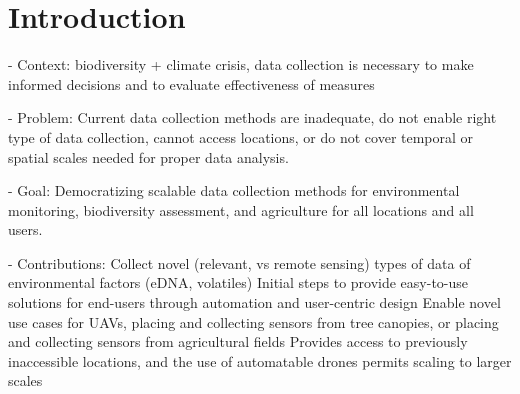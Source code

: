 \chapter{Introduction}
\label{ch:introduction}




- Context: biodiversity + climate crisis, data collection is necessary to make informed decisions and to evaluate effectiveness of measures

- Problem: Current data collection methods are inadequate, do not enable right type of data collection, cannot access locations, or do not cover temporal or spatial scales needed for proper data analysis. 

- Goal: Democratizing scalable data collection methods for environmental monitoring, biodiversity assessment, and agriculture for all locations and all users.

- Contributions:
Collect novel (relevant, vs remote sensing) types of data of environmental factors (eDNA, volatiles)
Initial steps to provide easy-to-use solutions for end-users through automation and user-centric design 
Enable novel use cases for UAVs, placing and collecting sensors from tree canopies, or placing and collecting sensors from agricultural fields
Provides access to previously inaccessible locations, and the use of automatable drones permits scaling to larger scales








